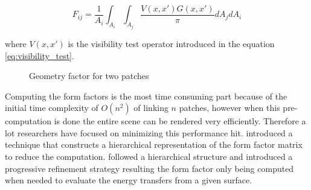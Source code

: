 \begin{equation}
F_{ij} = \frac{1}{A_i} \int_{A_i} \int_{A_j} \frac{V(x, x')G(x, x')}{\pi} dA_j dA_i 
\label{eq:form_factor}
\end{equation} 

where \(V(x, x')\) is the visibility test operator introduced in the equation \ref{eq:visibility_test}.




\begin{figure}[ht]
    \centering
    \renewcommand{\thefigure}{\thechapter.\arabic{figure}}
    \caption[Form factor geometry for two patches]{Geometry factor for two patches}
    \label{fig:form_factor}
\end{figure}

Computing the form factors is the most time consuming part because of the initial time complexity of \(O(n^{2})\) of linking \(n\) patches, however when this pre-computation is done the entire scene can be rendered very efficiently. Therefore a lot researchers have focused on minimizing this performance hit. \citeauthor{Hanrahan:1991:RHR:127719.122740} \cite{Hanrahan:1991:RHR:127719.122740} introduced a technique that constructs a hierarchical representation of the form factor matrix to reduce the computation. \citeauthor{Holzschuch94anefficient} \cite{Holzschuch94anefficient} followed a hierarchical structure and introduced a progressive refinement strategy resulting the form factor only being computed when needed to evaluate the energy transfers from a given surface.

